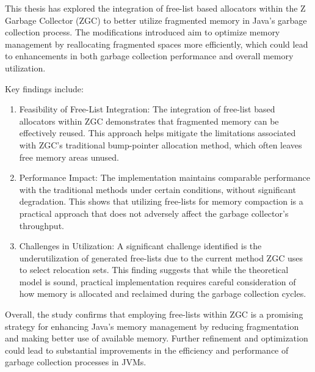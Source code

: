 

This thesis has explored the integration of free-list based allocators within the Z Garbage Collector (ZGC) to better utilize fragmented memory in Java's garbage collection process. The modifications introduced aim to optimize memory management by reallocating fragmented spaces more efficiently, which could lead to enhancements in both garbage collection performance and overall memory utilization.

Key findings include:
\begin{enumerate}
  \item Feasibility of Free-List Integration: The integration of free-list based allocators within ZGC demonstrates that fragmented memory can be effectively reused. This approach helps mitigate the limitations associated with ZGC's traditional bump-pointer allocation method, which often leaves free memory areas unused.
  \item Performance Impact: The implementation maintains comparable performance with the traditional methods under certain conditions, without significant degradation. This shows that utilizing free-lists for memory compaction is a practical approach that does not adversely affect the garbage collector's throughput.
  \item Challenges in Utilization: A significant challenge identified is the underutilization of generated free-lists due to the current method ZGC uses to select relocation sets. This finding suggests that while the theoretical model is sound, practical implementation requires careful consideration of how memory is allocated and reclaimed during the garbage collection cycles.
\end{enumerate}
Overall, the study confirms that employing free-lists within ZGC is a promising strategy for enhancing Java's memory management by reducing fragmentation and making better use of available memory. Further refinement and optimization could lead to substantial improvements in the efficiency and performance of garbage collection processes in JVMs.